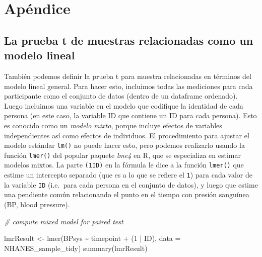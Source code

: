 \documentclass[
  12pt,
]{book}
\newenvironment{Shaded}{\begin{snugshade}}{\end{snugshade}}
\newcommand{\AttributeTok}[1]{\textcolor[rgb]{0.77,0.63,0.00}{#1}}
\newcommand{\CommentTok}[1]{\textcolor[rgb]{0.56,0.35,0.01}{\textit{#1}}}
\newcommand{\DecValTok}[1]{\textcolor[rgb]{0.00,0.00,0.81}{#1}}
\newcommand{\FunctionTok}[1]{\textcolor[rgb]{0.00,0.00,0.00}{#1}}
\newcommand{\NormalTok}[1]{#1}
\newcommand{\OtherTok}[1]{\textcolor[rgb]{0.56,0.35,0.01}{#1}}
\newcommand{\SpecialCharTok}[1]{\textcolor[rgb]{0.00,0.00,0.00}{#1}}
\begin{document}
\hypertarget{apuxe9ndice}{%
\section{Apéndice}\label{apuxe9ndice}}

\hypertarget{la-prueba-t-de-muestras-relacionadas-como-un-modelo-lineal}{%
\subsection{La prueba t de muestras relacionadas como un modelo lineal}\label{la-prueba-t-de-muestras-relacionadas-como-un-modelo-lineal}}

También podemos definir la prueba t para muestra relacionadas en términos del modelo lineal general. Para hacer esto, incluimos todas las mediciones para cada participante como el conjunto de datos (dentro de un dataframe ordenado). Luego incluimos una variable en el modelo que codifique la identidad de cada persona (en este caso, la variable ID que contiene un ID para cada persona). Esto es conocido como un \emph{modelo mixto}, porque incluye efectos de variables independientes así como efectos de individuos. El procedimiento para ajustar el modelo estándar \texttt{lm()} no puede hacer esto, pero podemos realizarlo usando la función \texttt{lmer()} del popular paquete \emph{lme4} en R, que se especializa en estimar modelos mixtos. La parte \texttt{(1\textbar{}ID)} en la fórmula le dice a la función \texttt{lmer()} que estime un intercepto separado (que es a lo que se refiere el \texttt{1}) para cada valor de la variable \texttt{ID} (i.e.~para cada persona en el conjunto de datos), y luego que estime una pendiente común relacionando el punto en el tiempo con presión sanguínea (BP, blood pressure).

\begin{Shaded}
\begin{Highlighting}[]
\CommentTok{\# compute mixed model for paired test}

\NormalTok{lmrResult }\OtherTok{\textless{}{-}} \FunctionTok{lmer}\NormalTok{(BPsys }\SpecialCharTok{\textasciitilde{}}\NormalTok{ timepoint }\SpecialCharTok{+}\NormalTok{ (}\DecValTok{1} \SpecialCharTok{|}\NormalTok{ ID), }
                  \AttributeTok{data =}\NormalTok{ NHANES\_sample\_tidy)}
\FunctionTok{summary}\NormalTok{(lmrResult)}
\end{Highlighting}
\end{Shaded}
\end{document}
